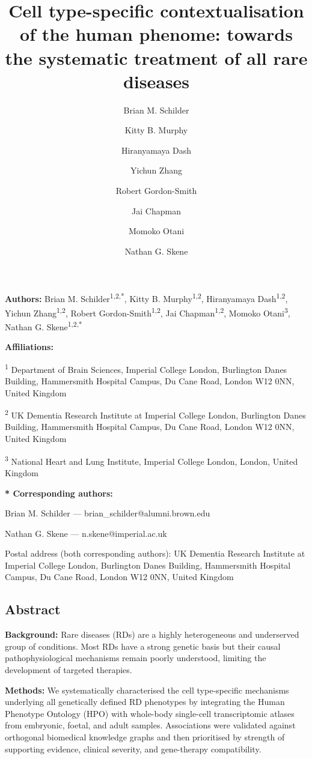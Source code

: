 \documentclass[
]{article}
\title{Cell type-specific contextualisation of the human phenome:
towards the systematic treatment of all rare diseases}
\author{Brian M. Schilder \and Kitty B. Murphy \and Hiranyamaya
Dash \and Yichun Zhang \and Robert Gordon-Smith \and Jai
Chapman \and Momoko Otani \and Nathan G. Skene}
\date{}
\begin{document}
\maketitle


\textbf{Authors:} Brian M. Schilder\textsuperscript{1,2,*}, Kitty B.
Murphy\textsuperscript{1,2}, Hiranyamaya Dash\textsuperscript{1,2},
Yichun Zhang\textsuperscript{1,2}, Robert
Gordon-Smith\textsuperscript{1,2}, Jai Chapman\textsuperscript{1,2},
Momoko Otani\textsuperscript{3}, Nathan G. Skene\textsuperscript{1,2,*}

\textbf{Affiliations:}

\textsuperscript{1} Department of Brain Sciences, Imperial College
London, Burlington Danes Building, Hammersmith Hospital Campus, Du Cane
Road, London W12 0NN, United Kingdom

\textsuperscript{2} UK Dementia Research Institute at Imperial College
London, Burlington Danes Building, Hammersmith Hospital Campus, Du Cane
Road, London W12 0NN, United Kingdom

\textsuperscript{3} National Heart and Lung Institute, Imperial College
London, London, United Kingdom

\textbf{* Corresponding authors:}

Brian M. Schilder --- brian\_schilder@alumni.brown.edu

Nathan G. Skene --- n.skene@imperial.ac.uk

Postal address (both corresponding authors): UK Dementia Research
Institute at Imperial College London, Burlington Danes Building,
Hammersmith Hospital Campus, Du Cane Road, London W12 0NN, United
Kingdom

\newpage

\subsection{Abstract}\label{abstract}

\textbf{Background:} Rare diseases (RDs) are a highly heterogeneous and
underserved group of conditions. Most RDs have a strong genetic basis
but their causal pathophysiological mechanisms remain poorly understood,
limiting the development of targeted therapies.

\textbf{Methods:} We systematically characterised the cell type-specific
mechanisms underlying all genetically defined RD phenotypes by
integrating the Human Phenotype Ontology (HPO) with whole-body
single-cell transcriptomic atlases from embryonic, foetal, and adult
samples. Associations were validated against orthogonal biomedical
knowledge graphs and then prioritised by strength of supporting
evidence, clinical severity, and gene-therapy compatibility.
\end{document}
